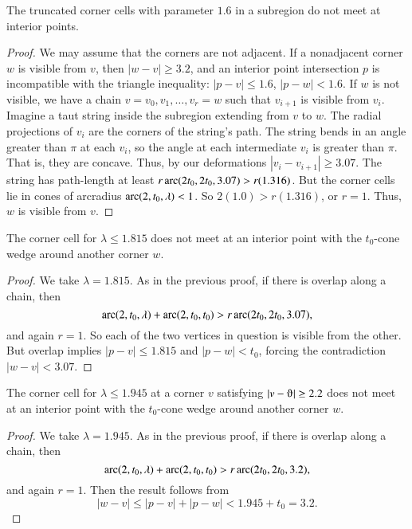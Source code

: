 \begin{lemma}
The truncated corner cells with parameter $1.6$ in a subregion do
not meet at interior points.
\end{lemma}

\begin{proof}
We may assume that the corners are not adjacent. If a nonadjacent
corner $w$ is visible from $v$, then $|w-v|\ge3.2$, and an
interior point intersection $p$ is incompatible with the triangle
inequality: $|p-v|\le 1.6$, $|p-w|<1.6$. If $w$ is not visible, we
have a chain $v=v_0,v_1,\ldots,v_r=w$ such that $v_{i+1}$ is
visible from $v_i$. Imagine a taut string inside the subregion
extending from $v$ to $w$. The radial projections of $v_i$ are the
corners of the string's path.   The string bends in an angle
greater than $\pi$ at each $v_i$, so the angle at each
intermediate $v_i$ is greater than $\pi$. That is, they are
concave. Thus, by our deformations $|v_i-v_{i+1}|\ge3.07$. The
string has path-length at least $r \operatorname{arc}(2t_0,2t_0,3.07)>r (1.316)$.
But the corner cells lie in cones of arcradius
$\operatorname{arc}(2,t_0,\lambda)< 1$. So $2(1.0)>r(1.316)$, or $r=1$.  Thus,
$w$ is visible from $v$.
\end{proof}

\begin{lemma}
The corner cell for $\lambda \le 1.815$ does not meet at an
interior point with the $t_0$-cone wedge around another corner
$w$.
\end{lemma}

\begin{proof}
We take $\lambda=1.815$. As in the previous proof, if there is overlap
along a chain, then
    $$\operatorname{arc}(2,t_0,\lambda) +\operatorname{arc}(2,t_0,t_0) > r \operatorname{arc}(2t_0,2t_0,3.07),$$
and again $r=1$.  So each of the two vertices in question is visible
from the other. But overlap implies $|p-v|\le1.815$ and $|p-w|<t_0$,
forcing the contradiction $|w-v|<3.07$.
\end{proof}

\begin{lemma}
The corner cell for $\lambda \le 1.945$ at a corner $v$ satisfying
$|v-\orgn|\ge2.2$ does not meet at an interior point with the $t_0$-cone
wedge around another corner $w$.
\end{lemma}

\begin{proof}
We take $\lambda=1.945$. As in the previous proof, if there is overlap
along a chain, then
    $$\operatorname{arc}(2,t_0,\lambda) +\operatorname{arc}(2,t_0,t_0) > r \operatorname{arc}(2t_0,2t_0,3.2),$$
and again $r=1$.  Then the result follows from
    $$|w-v|\le |p-v|+|p-w| < 1.945 + t_0 = 3.2.$$
\end{proof}





